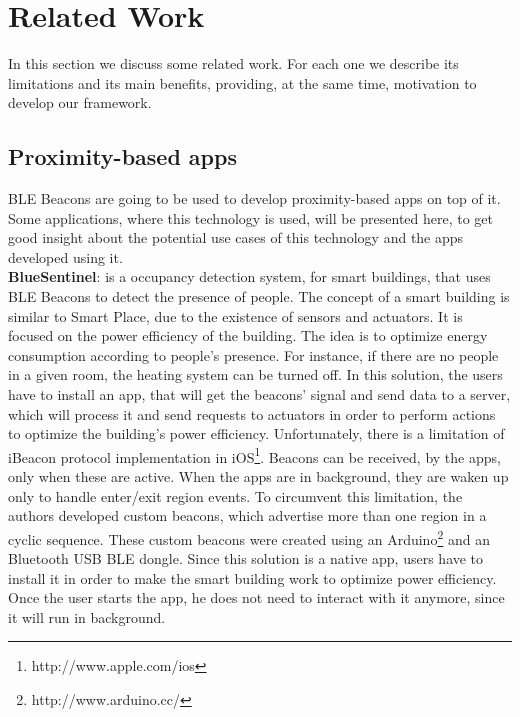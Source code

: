 
%
%

\section{Related Work}
\label{sec:related_work}
In this section we discuss some related work.
For each one we describe its limitations and its main
benefits, providing, at the same time, motivation
to develop our framework.

\subsection{Proximity-based apps}
\label{sub:ble_beacons_applications}
BLE Beacons are going to
be used to develop proximity-based apps
on top of it. Some
applications, where this technology is used,
will be presented here, to
get good insight about the potential use cases of this 
technology and the apps developed using it.
\\
\textbf{BlueSentinel}\cite{Conte2014}: is a 
occupancy detection system, for smart buildings,
that uses BLE Beacons to detect the presence of
people. The concept of a smart building
is similar to Smart Place,
due to the existence of sensors and actuators.
It is focused on the power efficiency of the
building. The idea is to optimize energy
consumption according to people's presence.
For instance, if there are no people in a given room,
the heating system can be turned off.
In this solution, the users have to install
an app, that will get the beacons' signal and
send data to a server, which will process it
and send requests to actuators in order to
perform actions to optimize the
building's power efficiency.
Unfortunately, there is a limitation
of iBeacon protocol implementation
in iOS\footnote{http://www.apple.com/ios}.
Beacons can be received, by the apps,
only when these are active. When the apps are in
background, they are waken up only to handle
enter/exit region events. To circumvent this
limitation, the authors developed custom
beacons, which advertise more than one region
in a cyclic sequence. These custom beacons
were created using an 
Arduino\footnote{http://www.arduino.cc/}
and an Bluetooth USB BLE dongle.
Since this solution is a native app,
users have to install it in order
to make the smart building work to
optimize power efficiency.
Once the user starts the app, he does not
need to interact with it anymore, since it
will run in background.
